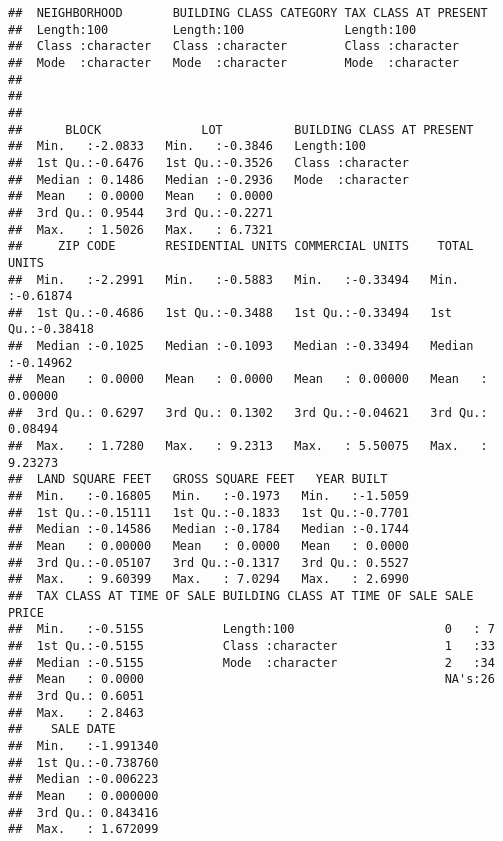\documentclass[
]{article}
\begin{document}
\begin{verbatim}
##  NEIGHBORHOOD       BUILDING CLASS CATEGORY TAX CLASS AT PRESENT
##  Length:100         Length:100              Length:100          
##  Class :character   Class :character        Class :character    
##  Mode  :character   Mode  :character        Mode  :character    
##                                                                 
##                                                                 
##                                                                 
##      BLOCK              LOT          BUILDING CLASS AT PRESENT
##  Min.   :-2.0833   Min.   :-0.3846   Length:100               
##  1st Qu.:-0.6476   1st Qu.:-0.3526   Class :character         
##  Median : 0.1486   Median :-0.2936   Mode  :character         
##  Mean   : 0.0000   Mean   : 0.0000                            
##  3rd Qu.: 0.9544   3rd Qu.:-0.2271                            
##  Max.   : 1.5026   Max.   : 6.7321                            
##     ZIP CODE       RESIDENTIAL UNITS COMMERCIAL UNITS    TOTAL UNITS      
##  Min.   :-2.2991   Min.   :-0.5883   Min.   :-0.33494   Min.   :-0.61874  
##  1st Qu.:-0.4686   1st Qu.:-0.3488   1st Qu.:-0.33494   1st Qu.:-0.38418  
##  Median :-0.1025   Median :-0.1093   Median :-0.33494   Median :-0.14962  
##  Mean   : 0.0000   Mean   : 0.0000   Mean   : 0.00000   Mean   : 0.00000  
##  3rd Qu.: 0.6297   3rd Qu.: 0.1302   3rd Qu.:-0.04621   3rd Qu.: 0.08494  
##  Max.   : 1.7280   Max.   : 9.2313   Max.   : 5.50075   Max.   : 9.23273  
##  LAND SQUARE FEET   GROSS SQUARE FEET   YEAR BUILT     
##  Min.   :-0.16805   Min.   :-0.1973   Min.   :-1.5059  
##  1st Qu.:-0.15111   1st Qu.:-0.1833   1st Qu.:-0.7701  
##  Median :-0.14586   Median :-0.1784   Median :-0.1744  
##  Mean   : 0.00000   Mean   : 0.0000   Mean   : 0.0000  
##  3rd Qu.:-0.05107   3rd Qu.:-0.1317   3rd Qu.: 0.5527  
##  Max.   : 9.60399   Max.   : 7.0294   Max.   : 2.6990  
##  TAX CLASS AT TIME OF SALE BUILDING CLASS AT TIME OF SALE SALE PRICE
##  Min.   :-0.5155           Length:100                     0   : 7   
##  1st Qu.:-0.5155           Class :character               1   :33   
##  Median :-0.5155           Mode  :character               2   :34   
##  Mean   : 0.0000                                          NA's:26   
##  3rd Qu.: 0.6051                                                    
##  Max.   : 2.8463                                                    
##    SALE DATE        
##  Min.   :-1.991340  
##  1st Qu.:-0.738760  
##  Median :-0.006223  
##  Mean   : 0.000000  
##  3rd Qu.: 0.843416  
##  Max.   : 1.672099
\end{verbatim}
\end{document}
